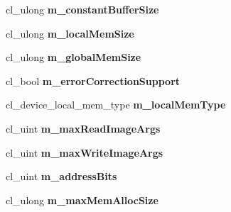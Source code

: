 \begin{DoxyCompactItemize}
\item 
\hypertarget{structbt_open_c_l_device_info_ae156af39f7b2831397a8e1e521a95f2e}{cl\+\_\+ulong {\bfseries m\+\_\+constant\+Buffer\+Size}}\label{structbt_open_c_l_device_info_ae156af39f7b2831397a8e1e521a95f2e}

\item 
\hypertarget{structbt_open_c_l_device_info_a46771a4a7fa613d0ff1daa8d2ed97b10}{cl\+\_\+ulong {\bfseries m\+\_\+local\+Mem\+Size}}\label{structbt_open_c_l_device_info_a46771a4a7fa613d0ff1daa8d2ed97b10}

\item 
\hypertarget{structbt_open_c_l_device_info_ac64a703e9c6f6bf935f46f25334f8cd4}{cl\+\_\+ulong {\bfseries m\+\_\+global\+Mem\+Size}}\label{structbt_open_c_l_device_info_ac64a703e9c6f6bf935f46f25334f8cd4}

\item 
\hypertarget{structbt_open_c_l_device_info_a1e1d2ee36f0d1b8a425d05572331923c}{cl\+\_\+bool {\bfseries m\+\_\+error\+Correction\+Support}}\label{structbt_open_c_l_device_info_a1e1d2ee36f0d1b8a425d05572331923c}

\item 
\hypertarget{structbt_open_c_l_device_info_afb9b1ae9bf59f89583a6949f011e0009}{cl\+\_\+device\+\_\+local\+\_\+mem\+\_\+type {\bfseries m\+\_\+local\+Mem\+Type}}\label{structbt_open_c_l_device_info_afb9b1ae9bf59f89583a6949f011e0009}

\item 
\hypertarget{structbt_open_c_l_device_info_a6f5b6ef92c4874eacd89fd05b7acdb3d}{cl\+\_\+uint {\bfseries m\+\_\+max\+Read\+Image\+Args}}\label{structbt_open_c_l_device_info_a6f5b6ef92c4874eacd89fd05b7acdb3d}

\item 
\hypertarget{structbt_open_c_l_device_info_a0596a8c24121bf58451a6e057d2dc521}{cl\+\_\+uint {\bfseries m\+\_\+max\+Write\+Image\+Args}}\label{structbt_open_c_l_device_info_a0596a8c24121bf58451a6e057d2dc521}

\item 
\hypertarget{structbt_open_c_l_device_info_a51140e6b17508162444c3787fc91048b}{cl\+\_\+uint {\bfseries m\+\_\+address\+Bits}}\label{structbt_open_c_l_device_info_a51140e6b17508162444c3787fc91048b}

\item 
\hypertarget{structbt_open_c_l_device_info_a67aae05a0b8945c6cac957e23c59da95}{cl\+\_\+ulong {\bfseries m\+\_\+max\+Mem\+Alloc\+Size}}\label{structbt_open_c_l_device_info_a67aae05a0b8945c6cac957e23c59da95}


\end{DoxyCompactItemize}
